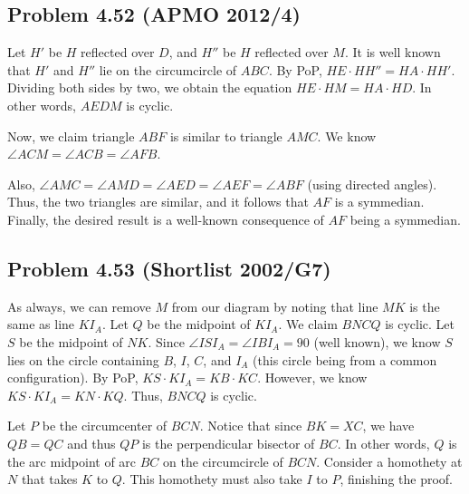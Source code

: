\documentclass{scrartcl}
\begin{document}
\subsection*{Problem 4.52 (APMO 2012/4)}
Let $H'$ be $H$ reflected over $D$, and $H''$ be $H$ reflected over $M$. It is well known that $H'$ and $H''$ lie on the circumcircle of $ABC$. By PoP, $HE \cdot HH'' = HA \cdot HH'$.
Dividing both sides by two, we obtain the equation $HE \cdot HM = HA \cdot HD$. In other words, $AEDM$ is cyclic.

Now, we claim triangle $ABF$ is similar to triangle $AMC$. We know $\angle ACM = \angle ACB = \angle AFB$.

Also, $\angle AMC = \angle AMD = \angle AED = \angle AEF = \angle ABF$ (using directed angles). Thus, the two triangles are similar, and it follows that $AF$ is a symmedian. 
Finally, the desired result is a well-known consequence of $AF$ being a symmedian.
\subsection*{Problem 4.53 (Shortlist 2002/G7)}
As always, we can remove $M$ from our diagram by noting that line $MK$ is the same as line $KI_A$.
Let $Q$ be the midpoint of $KI_A$. We claim $BNCQ$ is cyclic.
Let $S$ be the midpoint of $NK$. Since $\angle ISI_A = \angle IBI_A = 90$ (well known), we know $S$ lies on the circle containing $B$, $I$, $C$, and $I_A$ (this circle being from a common configuration). By PoP, $KS \cdot KI_A = KB \cdot KC$.
However, we know $KS \cdot KI_A = KN \cdot KQ$. Thus, $BNCQ$ is cyclic.

Let $P$ be the circumcenter of $BCN$. Notice that since $BK = XC$, we have $QB = QC$ and thus $QP$ is the perpendicular bisector of $BC$. In other words, $Q$ is the arc midpoint of arc $BC$ on the circumcircle of $BCN$. Consider a homothety at $N$ that takes $K$ to $Q$. This homothety must also take $I$ to $P$, finishing the proof.
\end{document}

